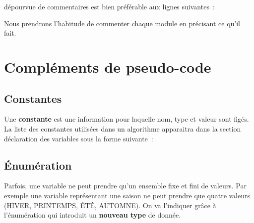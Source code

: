 
		dépourvue de commentaires est bien préférable aux lignes suivantes~:

		
		Nous prendrons l’habitude de commenter chaque module en précisant ce qu’il fait.

	\section{Compléments de pseudo-code}


		\subsection{Constantes}

			Une \textbf{constante} est une information pour laquelle nom, type et
			valeur sont figés. La liste des constantes utilisées dans un algorithme
			apparaitra dans la section déclaration des variables sous la forme
			suivante~:



		\subsection{Énumération}

			Parfois, une variable ne peut prendre qu’un ensemble
			fixe et fini de valeurs. Par exemple une variable représentant une
			saison ne peut prendre que quatre valeurs (HIVER, PRINTEMPS, ÉTÉ,
			AUTOMNE). On va l’indiquer grâce à
			l’énumération qui introduit un \textbf{nouveau type}
			de donnée.

